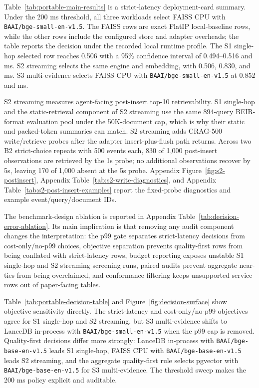 

Table~\ref{tab:portable-main-results} is a strict-latency deployment-card summary. Under the 200 ms \maxrowp threshold, all three workloads select FAISS CPU with \texttt{BAAI/bge-small-en-v1.5}. The FAISS rows are exact FlatIP local-baseline rows, while the other rows include the configured store and adapter overheads; the table reports the decision under the recorded local runtime profile. The S1 single-hop selected row reaches \ndcg{} 0.506 with a 95\% confidence interval of 0.494--0.516 and  ms. S2 streaming selects the same engine and embedding, with \ndcg{} 0.506, \postinsertfive{} 0.830, and  ms. S3 multi-evidence selects FAISS CPU with \texttt{BAAI/bge-small-en-v1.5} at \ecov{} 0.852 and  ms.

S2 streaming measures agent-facing post-insert top-10 retrievability. S1 single-hop and the static-retrieval component of S2 streaming use the same 894-query BEIR-format evaluation pool under the 50K-document cap, which is why their static \ndcg{} and packed-token summaries can match. S2 streaming adds CRAG-500 write/retrieve probes after the adapter insert-plus-flush path returns. Across two B2 strict-choice repeats with 500 events each, 830 of 1{,}000 post-insert observations are retrieved by the 1s probe; no additional observations recover by 5s, leaving 170 of 1{,}000 absent at the 5s probe. Appendix Figure~\ref{fig:s2-postinsert}, Appendix Table~\ref{tab:s2-write-diagnostics}, and Appendix Table~\ref{tab:s2-post-insert-examples} report the fixed-probe diagnostics and example event/query/document IDs.

The benchmark-design ablation is reported in Appendix Table~\ref{tab:decision-error-ablation}. Its main implication is that removing any audit component changes the interpretation: the p99 gate separates strict-latency decisions from cost-only/no-p99 choices, objective separation prevents quality-first rows from being conflated with strict-latency rows, budget reporting exposes unstable S1 single-hop and S2 streaming screening runs, paired audits prevent aggregate near-ties from being overclaimed, and conformance filtering keeps unsupported service rows out of paper-facing tables.



Table~\ref{tab:portable-decision-table} and Figure~\ref{fig:decision-surface} show objective sensitivity directly. The strict-latency and cost-only/no-p99 objectives agree for S1 single-hop and S2 streaming, but S3 multi-evidence shifts to LanceDB in-process with \texttt{BAAI/bge-small-en-v1.5} when the p99 cap is removed. Quality-first decisions differ more strongly: LanceDB in-process with \texttt{BAAI/bge-base-en-v1.5} leads S1 single-hop, FAISS CPU with \texttt{BAAI/bge-base-en-v1.5} leads S2 streaming, and the aggregate quality-first rule selects pgvector with \texttt{BAAI/bge-base-en-v1.5} for S3 multi-evidence. The threshold sweep makes the 200 ms policy explicit and auditable.

